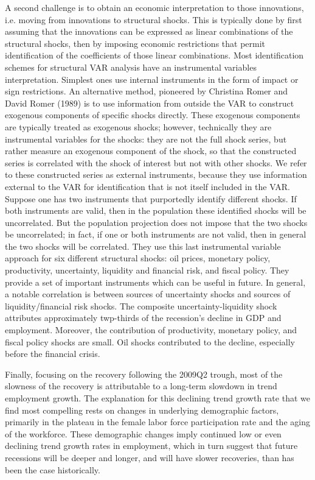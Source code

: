 \documentclass{article}
\begin{document}
{A second challenge is to obtain an economic interpretation to those innovations, i.e. moving from innovations to structural shocks. This is typically done by first assuming that the innovations can be expressed as linear combinations of the structural shocks, then by imposing economic restrictions that permit identification of the coefficients of those linear combinations. Most identification schemes for structural VAR analysis have an instrumental variables interpretation. Simplest ones use internal instruments in the form of impact or sign restrictions. An alternative method, pioneered by Christina Romer and David Romer (1989) is to use information from outside the VAR to construct exogenous components of specific shocks directly. These exogenous components are typically treated as exogenous shocks; however, technically they are instrumental variables for the shocks: they are not the full shock series, but rather measure an exogenous component of the shock, so that the constructed series is correlated with the shock of interest but not with other shocks. We refer to these constructed series as external instruments, because they use information external to the VAR for identification that is not itself included in the VAR. Suppose one has two instruments that purportedly identify different shocks. If both instruments are valid, then in the population these identified shocks will be uncorrelated. But the population projection does not impose that the two shocks be uncorrelated; in fact, if one or both instruments are not valid, then in general the two shocks will be correlated. They use this last instrumental variable approach for six different structural shocks: oil prices, monetary policy, productivity, uncertainty, liquidity and financial risk, and fiscal policy. They provide a set of important instruments which can be useful in future. In general, a notable correlation is between sources of uncertainty shocks and sources of liquidity/financial risk shocks. The composite uncertainty-liquidity shock attributes approximately twp-thirds of the recession's decline in GDP and employment. Moreover, the contribution of productivity, monetary policy, and fiscal policy shocks are small. Oil shocks contributed to the decline, especially before the financial crisis.

Finally, focusing on the recovery following the 2009Q2 trough, most of the slowness of the recovery is attributable to a long-term slowdown in trend employment growth. The explanation for this declining trend growth rate that we find most compelling rests on changes in underlying demographic factors, primarily in the plateau in the female labor force participation rate and the aging of the workforce. These demographic changes imply continued low or even declining trend growth rates in employment, which in turn suggest that future recessions will be deeper and longer, and will have slower recoveries, than has been the case historically.

}
\end{document}

